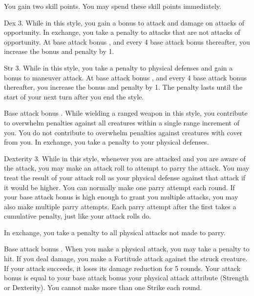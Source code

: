  You gain two skill points. You may spend these skill points immediately.

 Dex 3.
 While in this style, you gain a  bonus to attack and damage on attacks of opportunity. In exchange, you take a  penalty to attacks that are not attacks of opportunity. At base attack bonus , and every 4 base attack bonus thereafter, you increase the bonus and penalty by 1.

 Str 3.
 While in this style, you take a  penalty to physical defenses and gain a  bonus to maneuver attack. At base attack bonus , and every 4 base attack bonus thereafter, you increase the bonus and penalty by 1. The penalty lasts until the start of your next turn after you end the style.

 Base attack bonus .
 While wielding a ranged weapon in this style, you contribute to overwhelm penalties against all creatures within a single range increment of you. You do not contribute to overwhelm penalties against creatures with cover from you. In exchange, you take a  penalty to your physical defenses.

\featpre Dexterity 3.
\featben While in this style, whenever you are attacked and you are aware of the attack, you may make an attack roll to attempt to parry the attack. You may treat the result of your attack roll as your physical defense against that attack if it would be higher. You can normally make one parry attempt each round. If your base attack bonus is high enough to grant you multiple attacks, you may also make multiple parry attempts. Each parry attempt after the first takes a cumulative  penalty, just like your attack rolls do.

In exchange, you take a  penalty to all physical attacks not made to parry.

\featpre Base attack bonus .
\featben When you make a physical attack, you may take a  penalty to hit. If you deal damage, you make a Fortitude attack against the struck creature. If your attack succeeds, it loses its damage reduction for 5 rounds. Your attack bonus is equal to your base attack bonus \add your physical attack attribute (Strength or Dexterity). You cannot make more than one Strike each round.


